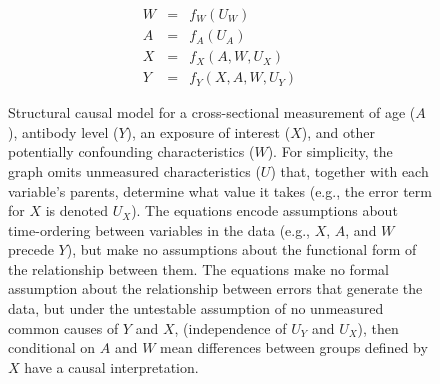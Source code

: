 \documentclass[11pt]{article}
\begin{document}
\begin{figure}[t]
\centering
\begin{subfigure}[t]{0.25\textwidth}
\end{subfigure}

\begin{subfigure}[t]{0.25\textwidth}
\begin{eqnarray*}
	W & = & f_W(U_W) \\
	A & = & f_A(U_A) \\
	X & = & f_X(A,W,U_X) \\
	Y & = & f_Y(X,A,W,U_Y)
\end{eqnarray*}
\end{subfigure}

\vspace{10pt}
\begin{minipage}{0.75\textwidth}

\caption{Structural causal model for a cross-sectional measurement of age ($A$), antibody level ($Y$), an exposure of interest ($X$), and other potentially confounding characteristics ($W$). For simplicity, the graph omits unmeasured characteristics ($U$) that, together with each variable's parents, determine what value it takes (e.g., the error term for $X$ is denoted $U_X$). The equations encode assumptions about time-ordering between variables in the data (e.g., $X$, $A$, and $W$ precede $Y$), but make no assumptions about the functional form of the relationship between them. The equations make no formal assumption about the relationship between errors that generate the data, but under the untestable assumption of no unmeasured common causes of $Y$ and $X$, (independence of $U_Y$ and $U_X$), then conditional on $A$ and $W$ mean differences between groups defined by $X$ have a causal interpretation. }
\end{minipage}
\end{figure}
\end{document}
